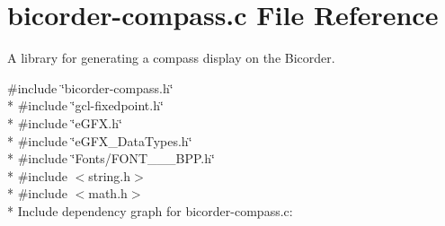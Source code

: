 \hypertarget{bicorder-compass_8c}{}\section{bicorder-\/compass.c File Reference}
\label{bicorder-compass_8c}


A library for generating a compass display on the Bicorder.  


{\ttfamily \#include \char`\"{}bicorder-\/compass.\+h\char`\"{}}\\*
{\ttfamily \#include \char`\"{}gcl-\/fixedpoint.\+h\char`\"{}}\\*
{\ttfamily \#include \char`\"{}e\+G\+F\+X.\+h\char`\"{}}\\*
{\ttfamily \#include \char`\"{}e\+G\+F\+X\+\_\+\+Data\+Types.\+h\char`\"{}}\\*
{\ttfamily \#include \char`\"{}Fonts/\+F\+O\+N\+T\+\_\+\_\+\_\+B\+P\+P.\+h\char`\"{}}\\*
{\ttfamily \#include $<$string.\+h$>$}\\*
{\ttfamily \#include $<$math.\+h$>$}\\*
Include dependency graph for bicorder-\/compass.c\+:

